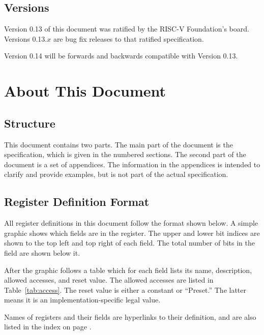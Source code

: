 \subsection{Versions}

Version 0.13 of this document was ratified by the RISC-V Foundation's board.
Versions 0.13.$x$ are bug fix releases to that ratified specification.

Version 0.14 will be forwards and backwards compatible with Version 0.13.

\section{About This Document}

\subsection{Structure}

This document contains two parts. The main part of the document is the
specification, which is given in the numbered sections. The second part
of the document is a set of  appendices. The information
in the appendices is intended to clarify and provide examples, but is
not part of the actual specification.

\subsection{Register Definition Format}

All register definitions in this document follow the format shown below.  A
simple graphic shows which fields are in the register. The upper and lower bit
indices are shown to the top left and top right of each field. The total number
of bits in the field are shown below it.

After the graphic follows a table which for each field lists its name,
description, allowed accesses, and reset value. The allowed accesses are listed
in Table~\ref{tab:access}. The reset value is either a constant or ``Preset.''
The latter means it is an implementation-specific legal value.

Names of registers and their fields are hyperlinks to their definition, and are
also listed in the index on page \pageref{index}.



